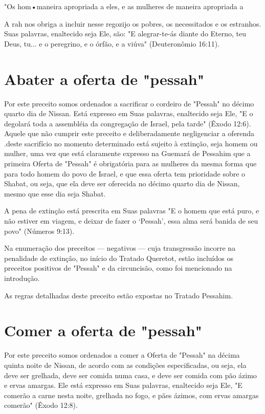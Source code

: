 \begin{itemize}
\begin{enumrate}
\begin{itemize}
\begin{itemize}
\begin{enumerate}
\end{enumerate}



"Os hom•maneira apropriada a eles, e as mulheres de maneira apro­priada
a

A rah nos obriga a incluir nesse regozijo os pobres, os necessita­dos e
os estranhos. Suas palavras, enaltecido seja Ele, são: "E alegrar-te-ás
dian­te do Eterno, teu Deus, tu... e o peregrino, e o órfão, e a viúva"
(Deuteronômio 16:11).


\section{Abater a oferta de "pessah"}


Por este preceito somos ordenados a sacrificar o cordeiro de "Pes­sah"
no décimo quarto dia de Nissan. Está expresso em Suas palavras,
enalteci­do seja Ele, "E o degolará toda a assembléia da congregação de
Israel, pela tar­de" (Êxodo 12:6). Aquele que não cumprir este preceito
e deliberadamente ne­gligenciar a oferenda .deste sacrifício no momento
determinado está sujeito à extinção, seja homem ou mulher, uma vez que
está claramente expresso na Gue­mará de Pessahim que a primeira Oferta
de "Pessah" é obrigatória para as mu­lheres da mesma forma que para todo
homem do povo de Israel, e que essa oferta tem prioridade sobre o
Shabat, ou seja, que ela deve ser oferecida no décimo quarto dia de
Nissan, mesmo que esse dia seja Shabat.

A pena de extinção está prescrita em Suas palavras "E o homem que está
puro, e não estiver em viagem, e deixar de fazer o `Pessah', essa alma
será banida de seu povo" (Números 9:13).

Na enumeração dos preceitos --- negativos --- cuja transgressão in­corre
na penalidade de extinção, no início do Tratado Queretot, estão
incluí­dos os preceitos positivos de "Pessah" e da circuncisão, como foi
mencionado na introdução.


As regras detalhadas deste preceito estão expostas no Tratado Pessahim.


\section{Comer a oferta de "pessah"}

Por este preceito somos ordenados a comer a Oferta de "Pessah" na décima
quinta noite de Nissan, de acordo com as condições especificadas, ou
seja, ela deve ser grelhada, deve ser comida numa casa, e deve ser
comida com pão ázimo e ervas amargas. Ele está expresso em Suas
palavras, enaltecido seja Ele, "E comerão a carne nesta noite, grelhada
no fogo, e pães ázimos, com ervas amargas comerão" (Êxodo 12:8).


\end{itemize}
\end{itemize}
\end{enumrate}
\end{itemize}
